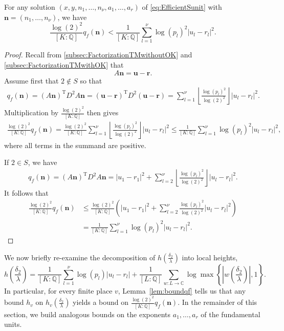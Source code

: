 \begin{lemma} \label{lem:boundqf}
For any solution $(x,y, n_1, \dots, n_{\nu}, a_1, \dots, a_r)$ of \eqref{eq:EfficientSunit} with $\mathbf{n} = (n_1, \dots, n_{\nu})$, we have 
\[\frac{\log(2)^2}{[K:\mathbb{Q}]}q_f(\mathbf{n}) < \frac{1}{[K:\mathbb{Q}]}\sum_{l = 1}^{\nu}\log(p_l)^2|u_l -r_l|^2.\] 
\end{lemma}

\begin{proof}
Recall from \autoref{subsec:FactorizationTMwithoutOK} and \autoref{subsec:FactorizationTMwithOK} that
\[A\mathbf{n} = \mathbf{u} - \mathbf{r}.\]
Assume first that $2 \notin S$ so that
\begin{align*}
q_f(\mathbf{n})	
	 = (A\mathbf{n})^{\text{T}}D^2A\mathbf{n}
	 = (\mathbf{u} - \mathbf{r})^{\text{T}}D^2(\mathbf{u} - \mathbf{r})
	 = \sum_{l = 1}^{\nu}\left\lfloor\frac{\log(p_l)^2}{\log(2)^2}\right\rfloor|u_l-r_l|^2.
\end{align*}
Multiplication by $\frac{\log(2)^2}{[K:\mathbb{Q}]}$ then gives
\begin{align*}
\frac{\log(2)^2}{[K:\mathbb{Q}]}q_f(\mathbf{n})  
	= \frac{\log(2)^2}{[K:\mathbb{Q}]}\sum_{l = 1}^{\nu} \left\lfloor\frac{\log(p_l)^2}{\log(2)^2}\right\rfloor|u_l -r_l|^2 
 	\leq \frac{1}{[K:\mathbb{Q}]}\sum_{l = 1}^{\nu}\log(p_l)^2|u_l -r_l|^2,
\end{align*}
where all terms in the summand are positive. 

If $2 \in S$, we have
\begin{align*}
q_f(\mathbf{n})	
	 = (A\mathbf{n})^{\text{T}}D^2A\mathbf{n}
	 = |u_1 - r_1|^2 + \sum_{l = 2}^{\nu}\left\lfloor\frac{\log(p_l)^2}{\log(2)^2}\right\rfloor|u_l-r_l|^2.
\end{align*}
It follows that
\begin{align*}
\frac{\log(2)^2}{[K:\mathbb{Q}]}q_f(\mathbf{n}) 
	& \leq \frac{\log(2)^2}{[K:\mathbb{Q}]}\left( |u_1 - r_1|^2 + \sum_{l = 2}^{\nu} \frac{\log(p_l)^2}{\log(2)^2}|u_l -r_l|^2\right) \\
	& = \frac{1}{[K:\mathbb{Q}]}\sum_{l = 1}^{\nu}\log(p_l)^2|u_l -r_l|^2.
\end{align*}
\end{proof}

We now briefly re-examine the decomposition of $h\left(\frac{\delta_2}{\lambda}\right)$ into local heights, 
\[h\left(\frac{\delta_2}{\lambda}\right) = \frac{1}{[K:\mathbb{Q}]}\sum_{l = 1}^{\nu} \log(p_l)|u_l - r_l| + \frac{1}{[L:\mathbb{Q}]}\sum_{w :L \to \mathbb{C}} \log \max \left\{ \left|w\left(\frac{\delta_2}{\lambda}\right)\right|, 1\right\}.\]
In particular, for every finite place $v$, Lemma~\ref{lem:boundqf} tells us that any bound $h_v$ on $h_v\left(\frac{\delta_2}{\lambda}\right)$ yields a bound on $\frac{\log(2)^2}{[K:\mathbb{Q}]}q_f(\mathbf{n})$. In the remainder of this section, we build analogous bounds on the exponents $a_1, \dots, a_r$ of the fundamental units. 

